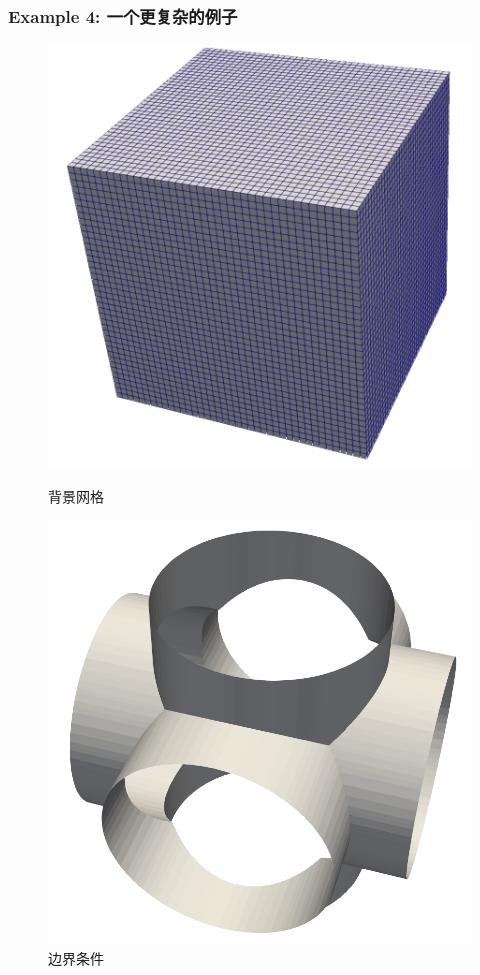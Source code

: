 \documentclass[lang=en,aspectratio=43,theme=default,logo=on]{simplebeamer}
\begin{document}
\begin{frame}[fragile]
    \frametitle{Example 4: 一个更复杂的例子}
    \begin{figure}
        \centering %
        \begin{minipage}[t]{0.5\linewidth}
            \centering
            \includegraphics[height=0.5\textheight]{./img/012.png}
            \caption{背景网格}
        \end{minipage}%
        \begin{minipage}[t]{0.5\linewidth}
            \centering
            \includegraphics[height=0.5\textheight]{./img/014.png}
            \caption{边界条件}
        \end{minipage}
    \end{figure}
\end{frame}
\end{document}
